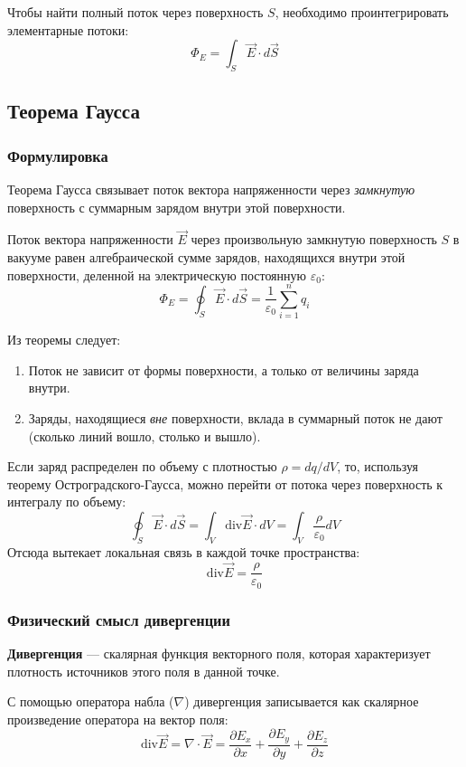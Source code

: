 Чтобы найти полный поток через поверхность $S$, необходимо проинтегрировать элементарные потоки:
\[
    \Phi_E = \int_S \vec{E} \cdot d\vec{S}
\]

\subsection{Теорема Гаусса}

\subsubsection{Формулировка}

Теорема Гаусса связывает поток вектора напряженности через \textit{замкнутую} поверхность с суммарным зарядом внутри этой поверхности.

Поток вектора напряженности $\vec{E}$ через произвольную замкнутую поверхность $S$ в вакууме равен алгебраической сумме зарядов, находящихся внутри этой поверхности, деленной на электрическую постоянную $\varepsilon_0$:
\[
    \Phi_E = \oint_S \vec{E} \cdot d\vec{S} = \frac{1}{\varepsilon_0} \sum_{i=1}^n q_i
\]

Из теоремы следует:
\begin{enumerate}
    \item Поток не зависит от формы поверхности, а только от величины заряда внутри.
    \item Заряды, находящиеся \textit{вне} поверхности, вклада в суммарный поток не дают (сколько линий вошло, столько и вышло).
\end{enumerate}

Если заряд распределен по объему с плотностью $\rho = dq/dV$, то, используя теорему Остроградского-Гаусса, можно перейти от потока через поверхность к интегралу по объему:
\[
    \oint_S \vec{E} \cdot d\vec{S} = \int_V \text{div} \vec{E} \cdot dV = \int_V \frac{\rho}{\varepsilon_0} dV
\]
Отсюда вытекает локальная связь в каждой точке пространства:
\[
    \text{div} \vec{E} = \frac{\rho}{\varepsilon_0}
\]

\subsubsection{Физический смысл дивергенции}

\textbf{Дивергенция} --- скалярная функция векторного поля, которая характеризует плотность источников этого поля в данной точке. 

С помощью оператора набла ($\nabla$) дивергенция записывается как скалярное произведение оператора на вектор поля:
\[
    \text{div} \vec{E} = \nabla \cdot \vec{E} = \frac{\partial E_x}{\partial x} + \frac{\partial E_y}{\partial y} + \frac{\partial E_z}{\partial z}
\]

